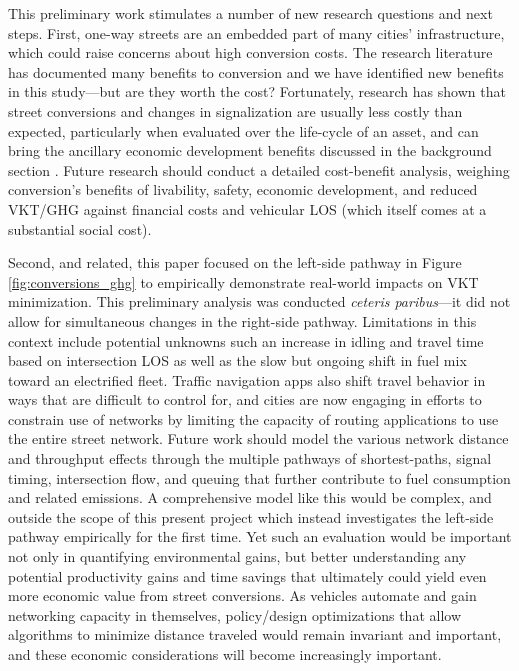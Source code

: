 \documentclass{article}
\begin{document}
This preliminary work stimulates a number of new research questions and next steps. First, one-way streets are an embedded part of many cities' infrastructure, which could raise concerns about high conversion costs. The research literature has documented many benefits to conversion and we have identified new benefits in this study---but are they worth the cost? Fortunately, research has shown that street conversions and changes in signalization are usually less costly than expected, particularly when evaluated over the life-cycle of an asset, and can bring the ancillary economic development benefits discussed in the background section \citep{speck_walkable_2018,riggs_two-way_2016,steuteville_cities_2019,noland_costs_2015}. Future research should conduct a detailed cost-benefit analysis, weighing conversion's benefits of livability, safety, economic development, and reduced VKT/GHG against financial costs and vehicular LOS (which itself comes at a substantial social cost).

Second, and related, this paper focused on the left-side pathway in Figure \ref{fig:conversions_ghg} to empirically demonstrate real-world impacts on VKT minimization. This preliminary analysis was conducted \textit{ceteris paribus}---it did not allow for simultaneous changes in the right-side pathway. Limitations in this context include potential unknowns such an increase in idling and travel time based on intersection LOS as well as the slow but ongoing shift in fuel mix toward an electrified fleet. Traffic navigation apps also shift travel behavior in ways that are difficult to control for, and cities are now engaging in efforts to constrain use of networks by limiting the capacity of routing applications to use the entire street network. Future work should model the various network distance and throughput effects through the multiple pathways of shortest-paths, signal timing, intersection flow, and queuing that further contribute to fuel consumption and related emissions. A comprehensive model like this would be complex, and outside the scope of this present project which instead investigates the left-side pathway empirically for the first time. Yet such an evaluation would be important not only in quantifying environmental gains, but better understanding any potential productivity gains and time savings that ultimately could yield even more economic value from street conversions. As vehicles automate and gain networking capacity in themselves, policy/design optimizations that allow algorithms to minimize distance traveled would remain invariant and important, and these economic considerations will become increasingly important.
\end{document}
